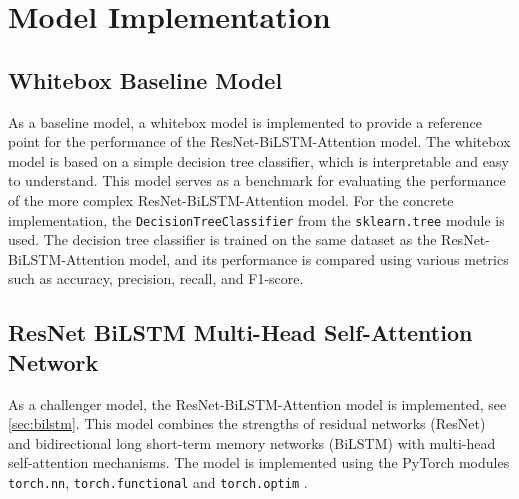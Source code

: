 \section{Model Implementation}

\subsection{Whitebox Baseline Model}
As a baseline model, a whitebox model is implemented to provide a reference point for the performance of the ResNet-BiLSTM-Attention model. The whitebox model is based on a simple decision tree classifier, which is interpretable and easy to understand. This model serves as a benchmark for evaluating the performance of the more complex ResNet-BiLSTM-Attention model. For the concrete implementation, the \texttt{DecisionTreeClassifier} from the \texttt{sklearn.tree} module is used. The decision tree classifier is trained on the same dataset as the ResNet-BiLSTM-Attention model, and its performance is compared using various metrics such as accuracy, precision, recall, and F1-score.


\subsection{ResNet BiLSTM Multi-Head Self-Attention Network}
As a challenger model, the ResNet-BiLSTM-Attention model is implemented, see \autoref{sec:bilstm}. This model combines the strengths of residual networks (ResNet) and bidirectional long short-term memory networks (BiLSTM) with multi-head self-attention mechanisms. The model is implemented using the PyTorch modules \texttt{torch.nn}, \texttt{torch.functional} and \texttt{torch.optim} \autocite{PyTorch}.

